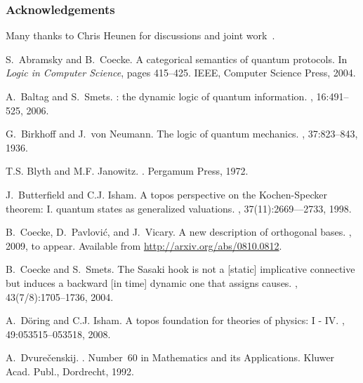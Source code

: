 \documentclass{article}
\begin{document}
\subsubsection*{Acknowledgements}

Many thanks to Chris Heunen for discussions and joint
work~\cite{HeunenJ09a}.





\begin{thebibliography}{10}

S.~Abramsky and B.~Coecke.
\newblock A categorical semantics of quantum protocols.
\newblock In {\em Logic in Computer Science}, pages 415--425. IEEE, Computer
  Science Press, 2004.

A.~Baltag and S.~Smets.
: the dynamic logic of quantum information.
, 16:491--525, 2006.

G.~Birkhoff and J.~von Neumann.
\newblock The logic of quantum mechanics.
, 37:823--843, 1936.

T.S. Blyth and M.F. Janowitz.
.
\newblock Pergamum Press, 1972.

J.~Butterfield and C.J. Isham.
\newblock A topos perspective on the {K}ochen-{S}pecker theorem: {I}. quantum
  states as generalized valuations.
, 37(11):2669–--2733, 1998.

B.~Coecke, D.~Pavlovi{\'c}, and J.~Vicary.
\newblock A new description of orthogonal bases.
, 2009, to appear.
\newblock Available from \url{http://arxiv.org/abs/0810.0812}.

B.~Coecke and S.~Smets.
\newblock The {Sasaki} hook is not a [static] implicative connective but
  induces a backward [in time] dynamic one that assigns causes.
, 43(7/8):1705--1736, 2004.

A.~D{\"o}ring and C.J. Isham.
\newblock A topos foundation for theories of physics: {I - IV}.
, 49:053515--053518, 2008.

A.~Dvure\v{c}enskij.
.
\newblock Number~60 in Mathematics and its Applications. Kluwer Acad. Publ.,
  Dordrecht, 1992.


\end{thebibliography}
\end{document}
